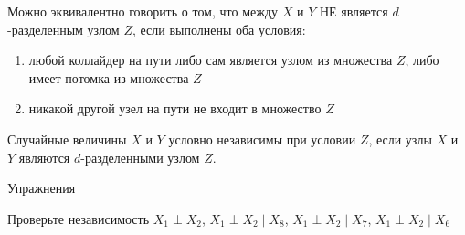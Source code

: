\documentclass[pdftex,12pt,a4paper]{article}
\begin{document}
Можно эквивалентно говорить о том, что между $X$ и $Y$ НЕ является $d$-разделенным узлом $Z$, если выполнены оба условия:
\begin{enumerate}
\item любой коллайдер на пути либо сам является узлом из множества $Z$, либо имеет потомка из множества $Z$
\item никакой другой узел на пути не входит в множество $Z$
\end{enumerate}


Случайные величины $X$ и $Y$ условно независимы при условии $Z$, если узлы $X$ и $Y$ являются $d$-разделенными узлом $Z$.


Упражнения

Проверьте независимость $X_1 \perp X_2$, $X_1 \perp X_2 \mid X_8$, $X_1 \perp X_2 \mid X_7$, $X_1 \perp X_2 \mid X_6$
\end{document}
